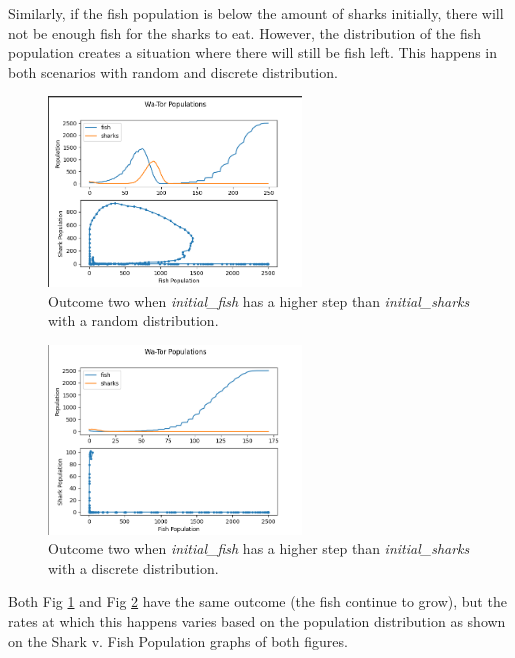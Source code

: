 \documentclass[12pt]{iopart} %
\begin{document}
Similarly, if the fish population is below the amount of sharks initially, there will not be enough fish for the sharks to eat. 
However, the distribution of the fish population creates a situation where there will still be fish left. 
This happens in both scenarios with random and discrete distribution.

\begin{figure}[h!tbp]
  \begin{center}
  \item[]\includegraphics[width=0.6\textwidth]{figure6.png}
  \caption{\label{fig:figure6}
  Outcome two when \emph{initial\_fish} has a higher step than \emph{initial\_sharks} with a random distribution.
  }
  \end{center}
\end{figure}

\begin{figure}[h!tbp]
  \begin{center}
  \item[]\includegraphics[width=0.6\textwidth]{figure7.png}
  \caption{\label{fig:figure7}
  Outcome two when \emph{initial\_fish} has a higher step than \emph{initial\_sharks} with a discrete distribution.
  }
  \end{center}
\end{figure}

Both Fig \ref{fig:figure6} and Fig \ref{fig:figure7} have the same outcome (the fish continue to grow), but the rates at which this happens varies based on the population distribution as shown on the Shark v. Fish Population graphs of both figures.
\end{document}
